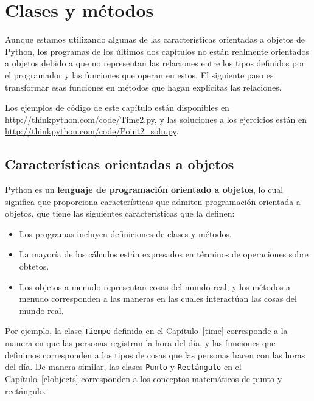 \documentclass[10pt]{book}
\begin{document}
\chapter{Clases y métodos}

Aunque estamos utilizando algunas de las características orientadas a objetos de Python,
los programas de los últimos dos capítulos no están realmente
orientados a objetos debido a que no representan las relaciones
entre los tipos definidos por el programador y las funciones que operan
en estos.  El siguiente paso es transformar esas funciones en
métodos que hagan explícitas las relaciones.

Los ejemplos de código de este capítulo están disponibles en
\url{http://thinkpython.com/code/Time2.py}, y las soluciones
a los ejercicios están en \url{http://thinkpython.com/code/Point2_soln.py}.


\section{Características orientadas a objetos}

Python es un {\bf lenguaje de programación orientado a objetos}, lo cual significa
que proporciona características que admiten programación
orientada a objetos, que tiene las siguientes características que la definen:

\begin{itemize}

\item Los programas incluyen definiciones de clases y métodos.

\item La mayoría de los cálculos están expresados en términos de operaciones sobre
  obtetos.

\item Los objetos a menudo representan cosas
del mundo real, y los métodos a menudo
corresponden a las maneras en las cuales interactúan las cosas del mundo real.

\end{itemize}

Por ejemplo, la clase {\tt Tiempo} definida en el Capítulo~\ref{time}
corresponde a la manera en que las personas registran la hora del día, y las
funciones que definimos corresponden a los tipos de cosas que las personas hacen con
las horas del día.  De manera similar, las clases {\tt Punto} y {\tt Rectángulo}
en el Capítulo~\ref{clobjects}
corresponden a los conceptos matemáticos de punto y rectángulo.
\end{document}
